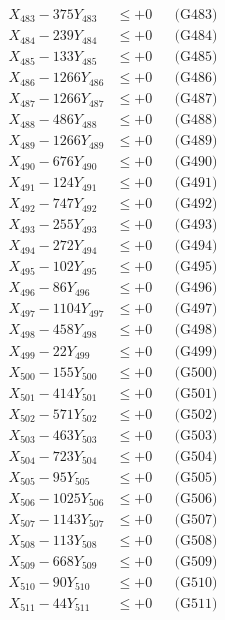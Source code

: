 \documentclass[a4paper,10pt]{article}
\begin{document}
{\begin{align}
X_{483} - 375Y_{483} &\leq +0 && \text{(G483)} \\
X_{484} - 239Y_{484} &\leq +0 && \text{(G484)} \\
X_{485} - 133Y_{485} &\leq +0 && \text{(G485)} \\
X_{486} - 1266Y_{486} &\leq +0 && \text{(G486)} \\
X_{487} - 1266Y_{487} &\leq +0 && \text{(G487)} \\
X_{488} - 486Y_{488} &\leq +0 && \text{(G488)} \\
X_{489} - 1266Y_{489} &\leq +0 && \text{(G489)} \\
X_{490} - 676Y_{490} &\leq +0 && \text{(G490)} \\
\allowbreak
X_{491} - 124Y_{491} &\leq +0 && \text{(G491)} \\
X_{492} - 747Y_{492} &\leq +0 && \text{(G492)} \\
X_{493} - 255Y_{493} &\leq +0 && \text{(G493)} \\
X_{494} - 272Y_{494} &\leq +0 && \text{(G494)} \\
X_{495} - 102Y_{495} &\leq +0 && \text{(G495)} \\
X_{496} - 86Y_{496} &\leq +0 && \text{(G496)} \\
X_{497} - 1104Y_{497} &\leq +0 && \text{(G497)} \\
X_{498} - 458Y_{498} &\leq +0 && \text{(G498)} \\
X_{499} - 22Y_{499} &\leq +0 && \text{(G499)} \\
X_{500} - 155Y_{500} &\leq +0 && \text{(G500)} \\
\allowbreak
X_{501} - 414Y_{501} &\leq +0 && \text{(G501)} \\
X_{502} - 571Y_{502} &\leq +0 && \text{(G502)} \\
X_{503} - 463Y_{503} &\leq +0 && \text{(G503)} \\
X_{504} - 723Y_{504} &\leq +0 && \text{(G504)} \\
X_{505} - 95Y_{505} &\leq +0 && \text{(G505)} \\
X_{506} - 1025Y_{506} &\leq +0 && \text{(G506)} \\
X_{507} - 1143Y_{507} &\leq +0 && \text{(G507)} \\
X_{508} - 113Y_{508} &\leq +0 && \text{(G508)} \\
X_{509} - 668Y_{509} &\leq +0 && \text{(G509)} \\
X_{510} - 90Y_{510} &\leq +0 && \text{(G510)} \\
\allowbreak
X_{511} - 44Y_{511} &\leq +0 && \text{(G511)} \\

\end{align}}
\end{document}
